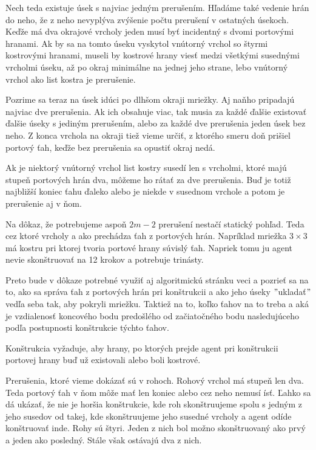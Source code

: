 Nech teda existuje úsek s najviac jedným prerušením. Hľadáme také vedenie
hrán do neho, že z neho nevyplýva zvýšenie počtu prerušení v ostatných
úsekoch. Keďže má dva okrajové vrcholy jeden musí byť incidentný s dvomi
portovými hranami. Ak by sa na tomto úseku vyskytol vnútorný vrchol so
štyrmi kostrovými hranami, museli by kostrové hrany viesť medzi všetkými
susednými vrcholmi úseku, až po okraj minimálne na jednej jeho strane, lebo
vnútorný vrchol ako list kostra je prerušenie.

Pozrime sa teraz na úsek idúci po dlhšom okraji mriežky. Aj naňho pripadajú
najviac dve prerušenia. Ak ich obsahuje viac, tak musia za každé ďalšie
existovať ďalšie úseky s jediným prerušením, alebo za každé dve prerušenia
jeden úsek bez neho. Z konca vrchola na okraji tiež vieme určiť, z ktorého
smeru doň prišiel portový ťah, keďže bez prerušenia sa opustiť okraj nedá.

Ak je niektorý vnútorný vrchol list kostry susedí len s vrcholmi, 
ktoré majú stupeň portových hrán dva, môžeme
ho rátať za dve prerušenia. Buď je totiž najbližší koniec ťahu ďaleko alebo
je niekde v  susednom vrchole a potom je prerušenie aj v ňom.

Na dôkaz, že potrebujeme aspoň $2m - 2$ prerušení nestačí statický pohľad. Teda
cez ktoré vrcholy a ako prechádza ťah z portových hrán. Napríklad mriežka $3
\times 3$ má kostru pri ktorej tvoria portové hrany súvislý ťah. Napriek
tomu ju agent nevie skonštruovať na 12 krokov a potrebuje trinásty.

Preto bude v dôkaze potrebné využiť aj algoritmickú stránku veci a pozrieť
sa na to, ako sa správa ťah z portových hrán pri konštrukcii a ako jeho
úseky $"$ukladať$"$ vedľa seba tak, aby pokryli mriežku. Taktiež na to, koľko
ťahov na to treba a aká je vzdialenosť koncového bodu predošlého od
začiatočného bodu nasledujúceho podľa postupnosti konštrukcie týchto ťahov.

Konštrukcia vyžaduje, aby hrany, po ktorých prejde agent pri konštrukcii
portovej hrany buď už existovali alebo boli kostrové.

Prerušenia, ktoré vieme dokázať sú v rohoch. Rohový vrchol má stupeň len
dva. Teda portový ťah v ňom môže mať len koniec alebo cez neho nemusí ísť.
Ľahko sa dá ukázať, že nie je horšia konštrukcie, kde roh skonštruujeme
spolu s jedným z jeho susedov od takej, kde skonštruujeme jeho susedné
vrcholy a agent odíde konštruovať inde. Rohy sú štyri. Jeden z nich bol
možno skonštruovaný ako prvý a jeden ako posledný. Stále však ostávajú dva z
nich.

